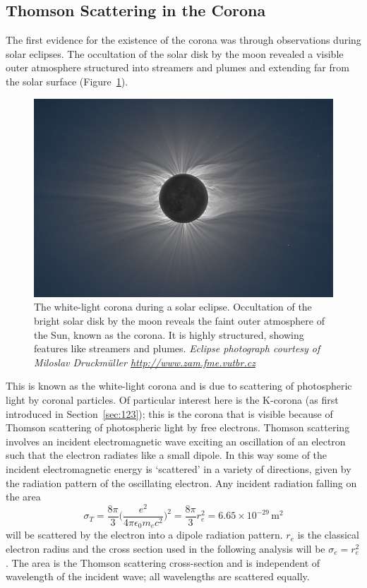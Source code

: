 \subsection{Thomson Scattering in the Corona}\label{sec:10}
\doublespacing
The first evidence for the existence of the corona was through observations during solar eclipses. The occultation of the solar disk by the moon revealed a visible outer atmosphere structured into streamers and plumes and extending far from the solar surface (Figure~\ref{fig:seclipse}). 
\begin{figure}[!t]
\begin{center}
\includegraphics[scale=0.45]{images/solar_eclipse}
\caption[White-light corona during an eclipse]{The white-light corona during a solar eclipse. Occultation of the bright solar disk by the moon reveals the faint outer atmosphere of the Sun, known as the corona. It is highly structured, showing features like streamers and plumes. {\it Eclipse photograph courtesy of Miloslav Druckm\"{u}ller \href{http://www.zam.fme.vutbr.cz/~druck/Index.htm}{http://www.zam.fme.vutbr.cz}}}
\label{fig:seclipse}
\end{center}
\end{figure}
This is known as the white-light corona and is due to scattering of photospheric light by coronal particles. Of particular interest here is the K-corona (as first introduced in Section~\ref{sec:123}); this is the corona that is visible because of Thomson scattering of photospheric light by free electrons. Thomson scattering involves an incident electromagnetic wave exciting an oscillation of an electron such that the electron radiates like a small dipole. In this way some of the incident electromagnetic energy is `scattered' in a variety of directions, given by the radiation pattern of the oscillating electron. Any incident radiation falling on the area
\begin{equation}
\sigma_T = \frac{8\pi}{3}\bigg(  \frac{e^2}{4\pi\epsilon_0 m_e c^2}   \bigg)^2 = \frac{8\pi}{3}r_e^2 = 6.65\times10^{-29}\,\mathrm{m}^2
\end{equation}
will be scattered by the electron into a dipole radiation pattern. $r_e$ is the classical electron radius and the cross section used in the following analysis will be $\sigma_e = r_e^2$. The area is the Thomson scattering cross-section and is independent of wavelength of the incident wave; all wavelengths are scattered equally. 


